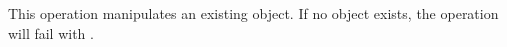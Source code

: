 \item This operation manipulates an existing object.  If no object exists, the
    operation will fail with .
